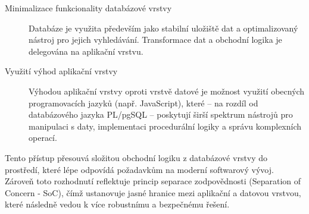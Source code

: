 \begin{description}
    \item[Minimalizace funkcionality databázové vrstvy] 
    Databáze je využita především jako stabilní uložiště dat a optimalizovaný nástroj pro jejich vyhledávání. Transformace dat a obchodní logika je delegována na aplikační vrstvu.
    \item[Využití výhod aplikační vrstvy]
    Výhodou aplikační vrstvy oproti vrstvě datové je možnost využití obecných programovacích jazyků (např. JavaScript), které – na rozdíl od databázového jazyka PL/pgSQL – poskytují širší spektrum nástrojů pro manipulaci s daty, implementaci procedurální logiky a správu komplexních operací.  
\end{description}
Tento přístup přesouvá složitou obchodní logiku z databázové vrstvy do prostředí, které lépe odpovídá požadavkům na moderní softwarový vývoj. Zároveň toto rozhodnutí reflektuje princip separace zodpovědnosti (Separation of Concern - SoC), čímž ustanovuje jasné hranice mezi aplikační a datovou vrstvou, které následně vedou k více robustnímu a bezpečnému řešení. \cite{de2002importance}
